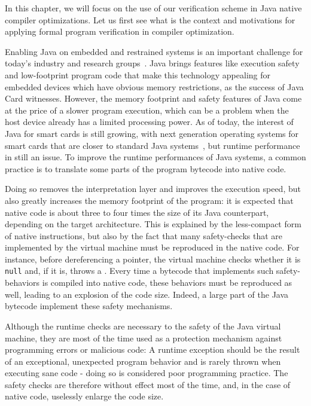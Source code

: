 
\label{sec:intro}

In this chapter, we will focus on the use of our verification scheme in  Java native compiler optimizations.
Let us first see what is the context and motivations for applying formal program verification in compiler optimization.

Enabling Java on embedded and restrained systems is an important challenge for today's industry and research groups~\cite{Mulchandani1998}. Java brings features like execution safety and low-footprint program code that make this technology appealing for embedded devices which have obvious memory restrictions, as the success of Java Card witnesses. However, the memory footprint and safety features of Java come at the price of a slower program execution, which can be a problem when the host device already has a limited processing power. As of today, the interest of Java for smart cards is still growing, with next generation operating systems for smart cards that are closer to standard Java systems~\cite{Lagosanto2002,Grimaud2003}, but runtime performance in still an issue. To improve the runtime performances of Java systems, a common practice is to translate some parts of the program bytecode into native code.

Doing so removes the interpretation layer and improves the execution speed, but also greatly increases the memory footprint of the program: it is expected that native code is about three to four times the size of its Java counterpart, depending on the target architecture. This is explained by the less-compact form of native instructions, but also by the fact that many safety-checks that are implemented by the virtual machine must be reproduced in the native code. For instance, before dereferencing a pointer, the virtual machine checks whether it is \texttt{null} and, if it is, throws a \NullPointerExc. Every time a bytecode that implements such safety-behaviors is compiled into native code, these behaviors must be reproduced as well, leading to an explosion of the code size. Indeed, a large part of the Java bytecode implement these safety mechanisms.

Although the runtime checks are necessary to the safety of the Java virtual machine, they are most of the time used as a protection mechanism against programming errors or malicious code: A runtime exception should be the result of an exceptional, unexpected program behavior and is rarely thrown when executing sane code - doing so is considered poor programming practice. The safety checks are therefore without effect most of the time, and, in the case of native code, uselessly enlarge the code size.

